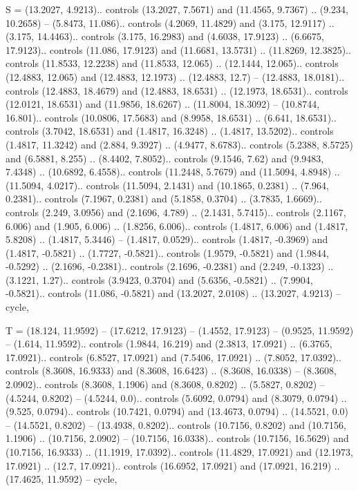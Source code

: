 S = {(13.2027, 4.9213).. controls (13.2027, 7.5671) and (11.4565, 9.7367) .. (9.234, 10.2658) -- (5.8473, 11.086).. controls (4.2069, 11.4829) and (3.175, 12.9117) .. (3.175, 14.4463).. controls (3.175, 16.2983) and (4.6038, 17.9123) .. (6.6675, 17.9123).. controls (11.086, 17.9123) and (11.6681, 13.5731) .. (11.8269, 12.3825).. controls (11.8533, 12.2238) and (11.8533, 12.065) .. (12.1444, 12.065).. controls (12.4883, 12.065) and (12.4883, 12.1973) .. (12.4883, 12.7) -- (12.4883, 18.0181).. controls (12.4883, 18.4679) and (12.4883, 18.6531) .. (12.1973, 18.6531).. controls (12.0121, 18.6531) and (11.9856, 18.6267) .. (11.8004, 18.3092) -- (10.8744, 16.801).. controls (10.0806, 17.5683) and (8.9958, 18.6531) .. (6.641, 18.6531).. controls (3.7042, 18.6531) and (1.4817, 16.3248) .. (1.4817, 13.5202).. controls (1.4817, 11.3242) and (2.884, 9.3927) .. (4.9477, 8.6783).. controls (5.2388, 8.5725) and (6.5881, 8.255) .. (8.4402, 7.8052).. controls (9.1546, 7.62) and (9.9483, 7.4348) .. (10.6892, 6.4558).. controls (11.2448, 5.7679) and (11.5094, 4.8948) .. (11.5094, 4.0217).. controls (11.5094, 2.1431) and (10.1865, 0.2381) .. (7.964, 0.2381).. controls (7.1967, 0.2381) and (5.1858, 0.3704) .. (3.7835, 1.6669).. controls (2.249, 3.0956) and (2.1696, 4.789) .. (2.1431, 5.7415).. controls (2.1167, 6.006) and (1.905, 6.006) .. (1.8256, 6.006).. controls (1.4817, 6.006) and (1.4817, 5.8208) .. (1.4817, 5.3446) -- (1.4817, 0.0529).. controls (1.4817, -0.3969) and (1.4817, -0.5821) .. (1.7727, -0.5821).. controls (1.9579, -0.5821) and (1.9844, -0.5292) .. (2.1696, -0.2381).. controls (2.1696, -0.2381) and (2.249, -0.1323) .. (3.1221, 1.27).. controls (3.9423, 0.3704) and (5.6356, -0.5821) .. (7.9904, -0.5821).. controls (11.086, -0.5821) and (13.2027, 2.0108) .. (13.2027, 4.9213) -- cycle},

T = {(18.124, 11.9592) -- (17.6212, 17.9123) -- (1.4552, 17.9123) -- (0.9525, 11.9592) -- (1.614, 11.9592).. controls (1.9844, 16.219) and (2.3813, 17.0921) .. (6.3765, 17.0921).. controls (6.8527, 17.0921) and (7.5406, 17.0921) .. (7.8052, 17.0392).. controls (8.3608, 16.9333) and (8.3608, 16.6423) .. (8.3608, 16.0338) -- (8.3608, 2.0902).. controls (8.3608, 1.1906) and (8.3608, 0.8202) .. (5.5827, 0.8202) -- (4.5244, 0.8202) -- (4.5244, 0.0).. controls (5.6092, 0.0794) and (8.3079, 0.0794) .. (9.525, 0.0794).. controls (10.7421, 0.0794) and (13.4673, 0.0794) .. (14.5521, 0.0) -- (14.5521, 0.8202) -- (13.4938, 0.8202).. controls (10.7156, 0.8202) and (10.7156, 1.1906) .. (10.7156, 2.0902) -- (10.7156, 16.0338).. controls (10.7156, 16.5629) and (10.7156, 16.9333) .. (11.1919, 17.0392).. controls (11.4829, 17.0921) and (12.1973, 17.0921) .. (12.7, 17.0921).. controls (16.6952, 17.0921) and (17.0921, 16.219) .. (17.4625, 11.9592) -- cycle},

